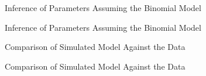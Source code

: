 \documentclass{beamer}
\begin{document}
\begin{frame}{Inference of Parameters Assuming the Binomial Model}
\end{frame}

\begin{frame}{Inference of Parameters Assuming the Binomial Model}
\end{frame}

\begin{frame}{Comparison of Simulated Model Against the Data}
\end{frame}

\begin{frame}{Comparison of Simulated Model Against the Data}
\end{frame}
\end{document}
